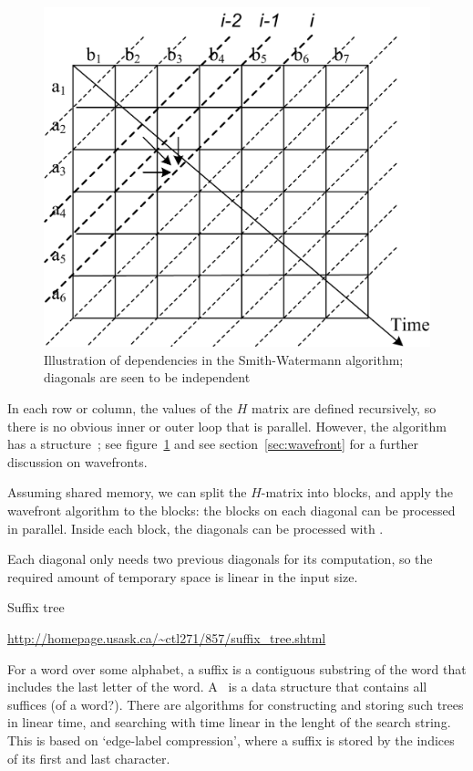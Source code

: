%
  \begin{figure}[ht]
  \includegraphics{graphics/smith-watermann-diagonal}
  \caption{Illustration of dependencies in the Smith-Watermann algorithm; diagonals are seen to be independent}
  \label{fig:sw-diagonal}  
  \end{figure}
%
In each row or column, the values of the $H$ matrix are defined
recursively, so there is no obvious inner or outer loop that is
parallel. However, the algorithm has a 
structure~\cite{Liu:cudasw2009}; see figure~\ref{fig:sw-diagonal} and
see section~\ref{sec:wavefront} for a further discussion on
wavefronts.

Assuming shared memory, we can split the $H$-matrix into blocks, and
apply the wavefront algorithm to the blocks: the blocks on each
diagonal can be processed in parallel. Inside each block, the
diagonals can be processed with .

Each diagonal only needs two previous diagonals for its computation,
so the required amount of temporary space is linear in the input size.

 {Suffix tree}

\url{http://homepage.usask.ca/~ctl271/857/suffix_tree.shtml}

For a word over some alphabet, a suffix is a contiguous substring of
the word that includes the last letter of the
word. A~ is a data structure that contains all
suffices (of a word?). There are algorithms for constructing and
storing such trees in linear time, and searching with time linear in
the lenght of the search string. This is based on `edge-label
compression', where a suffix is stored by the indices of its first and
last character.

